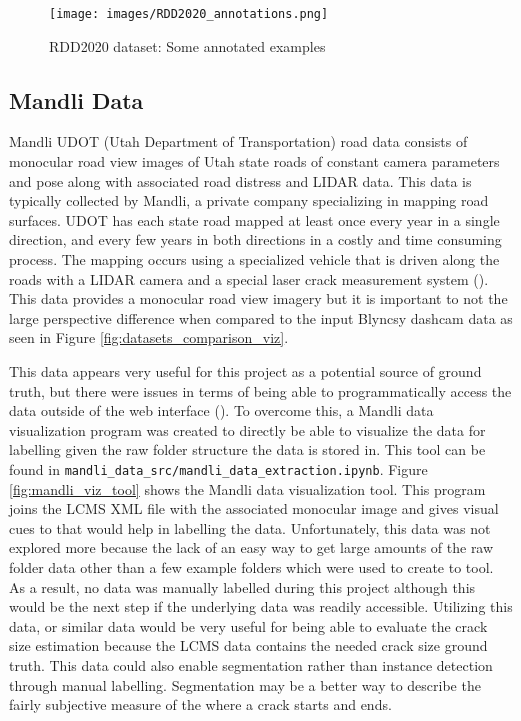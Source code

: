 \documentclass{article}
\begin{document}
\begin{figure}[ht]
\begin{center}
\texttt{[image: images/RDD2020\_annotations.png]}
\end{center}
\caption{RDD2020 dataset: Some annotated examples}
\label{fig:rdd2020}
\end{figure}

\subsection{Mandli Data}
Mandli UDOT (Utah Department of Transportation) road data consists of monocular road view images of Utah state roads of constant camera parameters and pose along with associated road distress and LIDAR data.
This data is typically collected by Mandli, a private company specializing in mapping road surfaces. 
UDOT has each state road mapped at least once every year in a single direction, and every few years in both directions in a costly and time consuming process.
The mapping occurs using a specialized vehicle that is driven along the roads with a LIDAR camera and a special laser crack measurement system (\cite{pavemetricsLCMS}).
This data provides a monocular road view imagery but it is important to not the large perspective difference when compared to the input Blyncsy dashcam data as seen in Figure \ref{fig:datasets_comparison_viz}.

This data appears very useful for this project as a potential source of ground truth, but there were issues in terms of being able to programmatically access the data outside of the web interface (\cite{roadviewExplorer5}).
To overcome this, a Mandli data visualization program was created to directly be able to visualize the data for labelling given the raw folder structure the data is stored in.
This tool can be found in \verb|mandli_data_src/mandli_data_extraction.ipynb|. 
Figure \ref{fig:mandli_viz_tool} shows the Mandli data visualization tool.
This program joins the LCMS XML file with the associated monocular image and gives visual cues to that would help in labelling the data.
Unfortunately, this data was not explored more because the lack of an easy way to get large amounts of the raw folder data other than a few example folders which were used to create to tool. 
As a result, no data was manually labelled during this project although this would be the next step if the underlying data was readily accessible. 
Utilizing this data, or similar data would be very useful for being able to evaluate the crack size estimation because the LCMS data contains the needed crack size ground truth.
This data could also enable segmentation rather than instance detection through manual labelling.
Segmentation may be a better way to describe the fairly subjective measure of the where a crack starts and ends.
\end{document}
